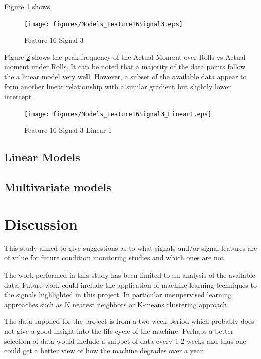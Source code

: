 \documentclass{article}
\begin{document}
Figure \ref{fig:Models_Feature16Signal3} shows 
\begin{figure}[H]
    \centering
    \texttt{[image: figures/Models\_Feature16Signal3.eps]}
    \caption{Feature 16 Signal 3}
    \label{fig:Models_Feature16Signal3}
\end{figure}

Figure \ref{fig:Models_Feature16Signal3_Linear1} shows the peak frequency of the Actual Moment over Rolls vs Actual moment under Rolls. It can be noted that a majority of the data points follow the a linear model very well. However, a subset of the available data appear to form another linear relationship with a similar gradient but slightly lower intercept.
\begin{figure}[H]
    \centering
    \texttt{[image: figures/Models\_Feature16Signal3\_Linear1.eps]}
    \caption{Feature 16 Signal 3 Linear 1}
    \label{fig:Models_Feature16Signal3_Linear1}
\end{figure}

\subsection{Linear Models}

\subsection{Multivariate models}

\clearpage 

\section{Discussion}
This study aimed to give suggestions as to what signals and/or signal features are of value for future condition monitoring studies and which ones are not.

The work performed in this study has been limited to an analysis of the available data. Future work could include the application of machine learning techniques to the signals highlighted in this project. In particular unsupervised learning approaches such as K nearest neighbors or K-means clustering approach.

The data supplied for the project is from a two week period which probably does not give a good insight into the life cycle of the machine. Perhaps a better selection of data would include a snippet of data every 1-2 weeks and thus one could get a better view of how the machine degrades over a year.
\end{document}
